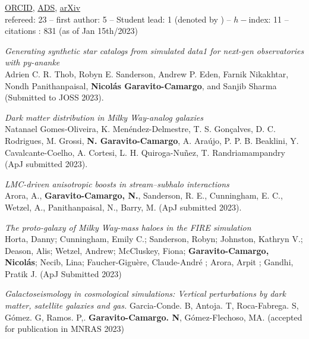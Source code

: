 \documentclass[UTF8]{article}
\begin{document}
\noindent \href{https://orcid.org/0000-0001-7107-1744}{ORCID},
\href{https://ui.adsabs.harvard.edu/search/q=docs(library%2F0X5_bcuLT4iE-6-Nko0kmg)&sort=date%20desc%2C%20bibcode%20desc&p_=0}{ADS},
\href{https://arxiv.org/search/?query=garavito-camargo&searchtype=all}{arXiv}\\
refereed: 23 -- first author: 5 -- Student lead: 1 (denoted by \dag )  -- $h-$index: 11 -- citations : 831 (as of Jan 15th/2023) 
\begin{etaremune}
  \setcounter{enumi}{24}

\item \textit{Generating synthetic star catalogs from simulated data1
  for next-gen observatories with py-ananke}\\
  Adrien C. R. Thob, Robyn E. Sanderson, Andrew P. Eden, Farnik
  Nikakhtar, Nondh Panithanpaisal, \textbf{Nicol\'as Garavito-Camargo},
  and Sanjib Sharma (Submitted to JOSS 2023).

\item \textit{Dark matter distribution in Milky Way-analog galaxies}\\ 
 Natanael Gomes-Oliveira, K. Menéndez-Delmestre, T. S. Gonçalves, D. C.
 Rodrigues, M. Grossi, \textbf{N. Garavito-Camargo}, A. Araújo, P. P. B. Beaklini, Y.
 Cavalcante-Coelho, A. Cortesi, L. H. Quiroga-Nuñez, T. Randriamampandry  (ApJ submitted 2023).

\item \textit{LMC-driven anisotropic boosts in stream–subhalo interactions} \dag \\
  Arora, A., \textbf{Garavito-Camargo, N.}, Sanderson, R. E., Cunningham, E. C., Wetzel, A., Panithanpaisal, N., Barry, M. (ApJ submitted 2023).

\item \textit{The proto-galaxy of Milky Way-mass haloes in the FIRE simulation}
  \\ Horta, Danny; Cunningham, Emily C.; Sanderson, Robyn; Johnston, Kathryn V.;
  Deason, Alis; Wetzel, Andrew; McCluskey, Fiona; \textbf{Garavito-Camargo,
  Nicol\'as}; Necib, Lina; Faucher-Giguère, 
  Claude-André ; Arora, Arpit ; Gandhi, Pratik J. (ApJ Submitted 2023)\\

\item \textit{Galactoseismology in cosmological simulations: Vertical
  perturbations by dark matter, satellite galaxies and gas.}  Garcia-Conde. B,
  Antoja. T, Roca-Fabrega. S, G\'omez. G, Ramos. P,. \textbf{Garavito-Camargo.
  N}, G\'omez-Flechoso,
  MA. (accepted for publication in MNRAS 2023)\\ 


\end{etaremune}
\end{document}
